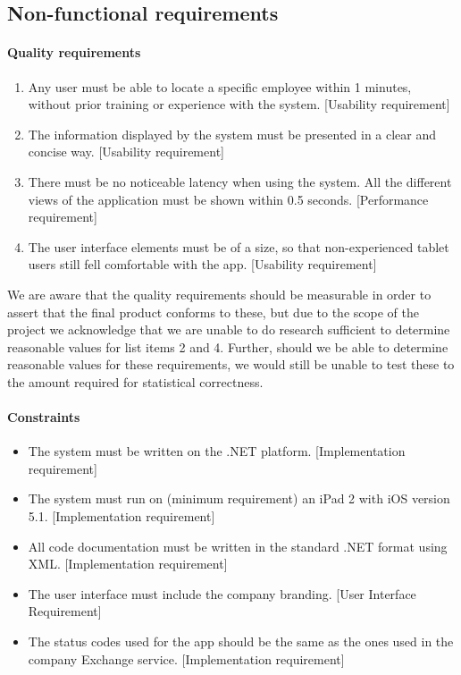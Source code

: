 \subsection{Non-functional requirements} %
\label{sub:Non-functional requirements}

\paragraph{Quality requirements} %
\label{ssub:Quality requirements}

\begin{enumerate}
\item Any user must be able to locate a specific employee within 1
  minutes, without prior training or experience with the
  system. [Usability requirement]
\item The information displayed by the system must be presented in a
  clear and concise way. [Usability requirement]
\item There must be no noticeable latency when using the system. All
  the different views of the application must be shown within 0.5
  seconds. [Performance requirement]
\item The user interface elements must be of a size, so that
  non-experienced tablet users still fell comfortable with the
  app. [Usability requirement]
\end{enumerate}

We are aware that the quality requirements should be measurable in
order to assert that the final product conforms to these, but due to
the scope of the project we acknowledge that we are unable to do
research sufficient to determine reasonable values for list items 2
and 4. Further, should we be able to determine reasonable values for
these requirements, we would still be unable to test these to the
amount required for statistical correctness.

\paragraph{Constraints} %
\label{ssub:Constraints}

\begin{itemize}
    \item The system must be written on the .NET
      platform. [Implementation requirement]
    \item The system must run on (minimum requirement) an iPad 2 with
      iOS version 5.1. [Implementation requirement]
    \item All code documentation must be written in the standard .NET
      format using XML. [Implementation requirement]
    \item The user interface must include the company branding. [User
      Interface Requirement]
    \item The status codes used for the app should be the same as the
      ones used in the company Exchange service. [Implementation
        requirement]
\end{itemize}

